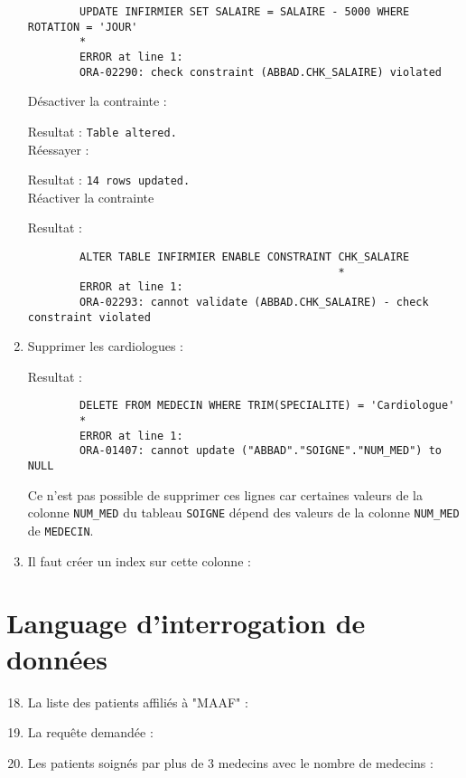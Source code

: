 \documentclass[12pt,a4paper]{article}
\begin{document}
\begin{enumerate}
\begin{verbatim}
		UPDATE INFIRMIER SET SALAIRE = SALAIRE - 5000 WHERE ROTATION = 'JOUR'
		*
		ERROR at line 1:
		ORA-02290: check constraint (ABBAD.CHK_SALAIRE) violated
		\end{verbatim}
		Désactiver la contrainte :
		
		Resultat : \texttt{Table altered.}\\
		Réessayer :
		
		Resultat : \texttt{14 rows updated.}\\
		Réactiver la contrainte
		
		Resultat :
		\begin{verbatim}
		ALTER TABLE INFIRMIER ENABLE CONSTRAINT CHK_SALAIRE
		                                        *
		ERROR at line 1:
		ORA-02293: cannot validate (ABBAD.CHK_SALAIRE) - check constraint violated
		\end{verbatim}
		\item Supprimer les cardiologues :
		
		Resultat :
		\begin{verbatim}
		DELETE FROM MEDECIN WHERE TRIM(SPECIALITE) = 'Cardiologue'
		*
		ERROR at line 1:
		ORA-01407: cannot update ("ABBAD"."SOIGNE"."NUM_MED") to NULL
		\end{verbatim}
		Ce n'est pas possible de supprimer ces lignes car certaines valeurs de la colonne \texttt{NUM\_MED} du
		tableau \texttt{SOIGNE} dépend des valeurs de la colonne \texttt{NUM\_MED} de \texttt{MEDECIN}.
		\item Il faut créer un index sur cette colonne :
		
	\end{enumerate}
\section{Language d'interrogation de données}
	\begin{enumerate}
		\setcounter{enumi}{17}
		\item La liste des patients affiliés à "MAAF" :
		
		\item La requête demandée :
		
		\item Les patients soignés par plus de 3 medecins avec le nombre de medecins :
		
	\end{enumerate}
\end{document}
